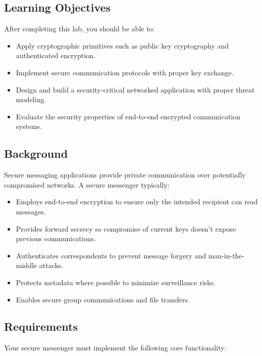 \documentclass[10pt,a4paper,american]{article}
\begin{document}
\subsection*{Learning Objectives}
After completing this lab, you should be able to:
\begin{itemize}
	\item Apply cryptographic primitives such as public key cryptography and authenticated encryption.
	\item Implement secure communication protocols with proper key exchange.
	\item Design and build a security-critical networked application with proper threat modeling.
	\item Evaluate the security properties of end-to-end encrypted communication systems.
\end{itemize}

\subsection*{Background}
Secure messaging applications provide private communication over potentially compromised networks. A secure messenger typically:
\begin{itemize}
	\item Employs end-to-end encryption to ensure only the intended recipient can read messages.
	\item Provides forward secrecy so compromise of current keys doesn't expose previous communications.
	\item Authenticates correspondents to prevent message forgery and man-in-the-middle attacks.
	\item Protects metadata where possible to minimize surveillance risks.
	\item Enables secure group communications and file transfers.
\end{itemize}

\subsection*{Requirements}
Your secure messenger must implement the following core functionality:
\end{document}
